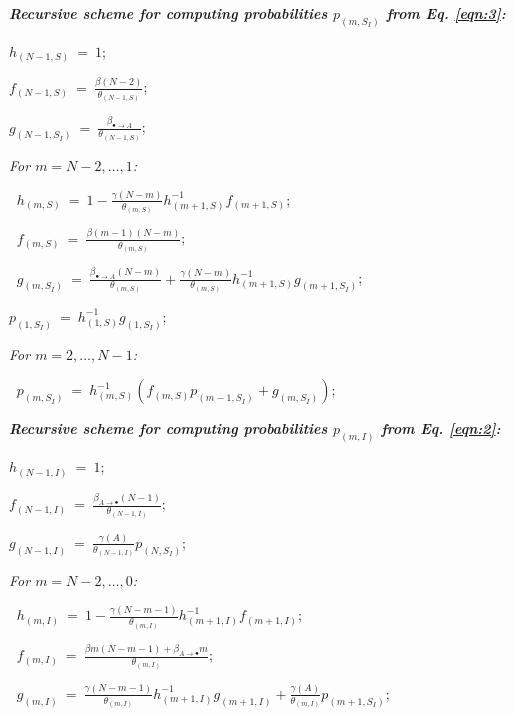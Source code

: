 \documentclass[preprint,12pt]{elsarticle}
\begin{document}
\par{}
\begin{description}
  \item \textit{\textbf{Recursive scheme for computing probabilities $p_{(m,S_I)}$ from Eq. \eqref{eqn:3}:}}
  \item $h_{(N-1,S)} ~=~ 1$;
  \item $f_{(N-1,S)} ~=~ \frac{\beta(N-2)}{\theta_{(N-1,S)}}$;
  \item $g_{(N-1,S_I)} ~=~ \frac{\beta_{\bullet\rightarrow A}}{\theta_{(N-1,S)}}$;
  \item \it For $m=N-2,\dots,1$:
  \item $~$\hspace{0.5cm} $h_{(m,S)} ~=~ 1-\frac{\gamma(N-m)}{\theta_{(m,S)}}h_{(m+1,S)}^{-1}f_{(m+1,S)}$;
  \item $~$\hspace{0.5cm} $f_{(m,S)} ~=~ \frac{\beta(m-1)(N-m)}{\theta_{(m,S)}}$;
  \item $~$\hspace{0.5cm} $g_{(m,S_I)} ~=~ \frac{\beta_{\bullet\rightarrow A}(N-m)}{\theta_{{(m,S)}}}+\frac{\gamma(N-m)}{\theta_{{(m,S)}}}h_{(m+1,S)}^{-1}g_{(m+1,S_I)}$;
  \item $p_{(1,S_I)} ~=~ h_{(1,S)}^{-1}g_{(1,S_I)}$;
  \item \it For $m=2,\dots,N-1$:
  \item $~$\hspace{0.5cm} $p_{(m,S_I)} ~=~ h_{(m,S)}^{-1}\left(f_{(m,S)}p_{(m-1,S_I)}+g_{(m,S_I)}\right)$;
  \item \textit{\textbf{Recursive scheme for computing probabilities $p_{(m,I)}$ from Eq. \eqref{eqn:2}:}}
  \item $h_{(N-1,I)} ~=~ 1$;
  \item $f_{(N-1,I)} ~=~ \frac{\beta_{A\rightarrow\bullet}(N-1)}{\theta_{(N-1,I)}}$;
  \item $g_{(N-1,I)} ~=~ \frac{\gamma(A)}{\theta_{(N-1,I)}}p_{(N,S_I)}$;
  \item \it For $m=N-2,\dots,0$:
  \item $~$\hspace{0.5cm} $h_{(m,I)} ~=~ 1-\frac{\gamma(N-m-1)}{\theta_{(m,I)}}h_{(m+1,I)}^{-1}f_{(m+1,I)}$;
  \item $~$\hspace{0.5cm} $f_{(m,I)} ~=~ \frac{\beta m(N-m-1)+\beta_{A\rightarrow\bullet}m}{\theta_{(m,I)}}$;
  \item $~$\hspace{0.5cm} $g_{(m,I)} ~=~ \frac{\gamma (N-m-1)}{\theta_{(m,I)}}h_{(m+1,I)}^{-1}g_{(m+1,I)}+\frac{\gamma(A)}{\theta_{(m,I)}}p_{(m+1,S_I)}$;

\end{description}
\end{document}

